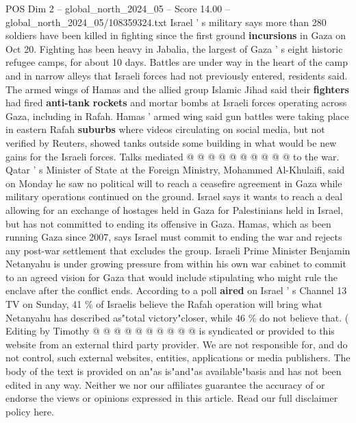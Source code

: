 \begin{textsample}{POS Dim 2 – global\_north\_2024\_05 – Score 14.00 – global\_north\_2024\_05/108359324.txt}
Israel ' s military says more than 280 soldiers have been killed in fighting since the first ground \textbf{incursions} in Gaza on Oct 20.
Fighting has been heavy in Jabalia, the largest of Gaza ' s eight historic refugee camps, for about 10 days.
Battles are under way in the heart of the camp and in narrow alleys that Israeli forces had not previously entered, residents said.
The armed wings of Hamas and the allied group Islamic Jihad said their \textbf{fighters} had fired \textbf{anti-tank} \textbf{rockets} and mortar bombs at Israeli forces operating across Gaza, including in Rafah.
Hamas ' armed wing said gun battles were taking place in eastern Rafah \textbf{suburbs} where videos circulating on social media, but not verified by Reuters, showed tanks outside some building in what would be new gains for the Israeli forces.
Talks mediated @ @ @ @ @ @ @ @ @ @ to the war.
Qatar ' s Minister of State at the Foreign Ministry, Mohammed Al-Khulaifi, said on Monday he saw no political will to reach a ceasefire agreement in Gaza while military operations continued on the ground.
Israel says it wants to reach a deal allowing for an exchange of hostages held in Gaza for Palestinians held in Israel, but has not committed to ending its offensive in Gaza.
Hamas, which as been running Gaza since 2007, says Israel must commit to ending the war and rejects any post-war settlement that excludes the group.
Israeli Prime Minister Benjamin Netanyahu is under growing pressure from within his own war cabinet to commit to an agreed vision for Gaza that would include stipulating who might rule the enclave after the conflict ends.
According to a poll \textbf{aired} on Israel ' s Channel 13 TV on Sunday, 41 \% of Israelis believe the Rafah operation will bring what Netanyahu has described as"total victory"closer, while 46 \% do not believe that. ( Editing by Timothy @ @ @ @ @ @ @ @ @ @ is syndicated or provided to this website from an external third party provider.
We are not responsible for, and do not control, such external websites, entities, applications or media publishers.
The body of the text is provided on an"as is"and"as available"basis and has not been edited in any way.
Neither we nor our affiliates guarantee the accuracy of or endorse the views or opinions expressed in this article.
Read our full disclaimer policy here.

\end{textsample}
